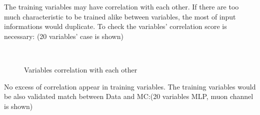 
			The training variables may have correlation with each other. If there are too much characteristic to be trained alike between variables, the most of input informations would duplicate. To check the variables' correlation score is necessary: (20 variables' case is shown)

			\begin{figure}[H]
			\centering
			    \\
			\caption{Variables correlation with each other}
			\label{EventSelReco:fig:a05_correlation}
			\end{figure}
			\FloatBarrier

			No excess of correlation appear in training variables. The training variables would be also validated match between Data and MC:(20 variables MLP, muon channel is shown)


